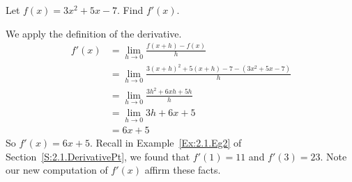 \begin{example} \label{Ex:2.2.Eg1}
Let $f(x) = 3x^2+5x-7$. Find $f'(x)$.

\solution We apply the definition of the derivative.
\begin{align*}
f'(x) &= \lim_{h \to 0} \frac{f(x+h)-f(x)}{h} \\
&=	\lim_{h \to 0} \frac{3(x+h)^2+5(x+h)-7-(3x^2+5x-7)}{h}\\
&=	\lim_{h \to 0} \frac{3h^2 +6xh+5h}{h}\\
&= \lim_{h \to 0} 3h+6x+5 \\
&= 6x+5
\end{align*}
So $f'(x) = 6x+5$. Recall in Example~\ref{Ex:2.1.Eg2} of Section~\ref{S:2.1.DerivativePt}, we found that $f'(1) = 11$ and $f'(3) = 23$. Note our new computation of $f'(x)$ affirm these facts.
\end{example}

